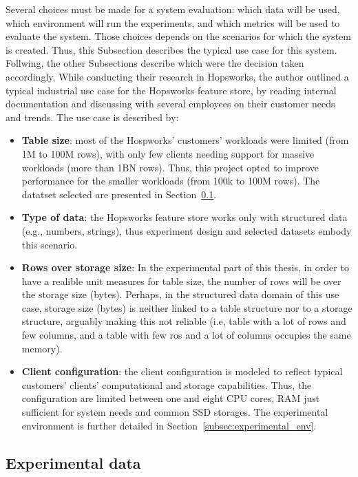 Several choices must be made for a system evaluation: which data will be used, which environment will run the experiments, and which metrics will be used to evaluate the system. Those choices depends on the scenarios for which the system is created. Thus, this Subsection describes the typical use case for this system. Follwing, the other Subsections describe which were the decision taken accordingly. While conducting their research in Hopsworks, the author outlined a typical industrial use case for the Hopsworks feature store, by reading internal documentation and discussing with several employees on their customer needs and trends. The use case is described by:
\begin{itemize}  
  \item \textbf{Table size}: most of the Hospworks' customers' workloads were limited (from 1M to 100M rows), with only few clients needing support for massive workloads (more than 1BN rows). Thus, this project opted to improve performance for the smaller workloads (from 100k to 100M rows). The datatset selected are presented in Section~\ref{subsec:experimental_data}.
  \item \textbf{Type of data}: the Hopsworks feature store works only with structured data (e.g., numbers, strings), thus experiment design and selected datasets embody this scenario.
  \item \textbf{Rows over storage size}: In the experimental part of this thesis, in order to have a realible unit measures for table size, the number of rows will be over the storage size (bytes). Perhaps, in the structured data domain of this use case, storage size (bytes) is neither linked to a table structure nor to a storage structure, arguably making this not reliable (i.e, table with a lot of rows and few columns, and a table with few ros and a lot of columns occupies the same memory).
  \item \textbf{Client configuration}: the client configuration is modeled to reflect typical customers' clients' computational and storage capabilities. Thus, the configuration are limited between one and eight \gls{CPU} cores, \gls{RAM} just sufficient for system needs and common \gls{SSD} storages. The experimental environment is further detailed in Section~\ref{subsec:experimental_env}.
\end{itemize}



\subsection{Experimental data}
\label{subsec:experimental_data}

